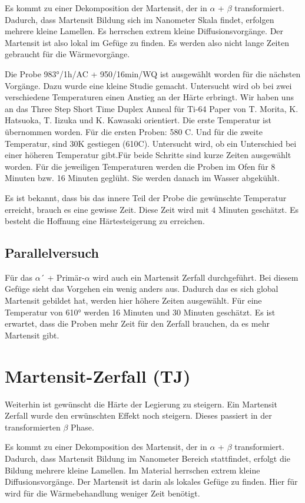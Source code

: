Es kommt zu einer Dekomposition der Martensit, der in $\alpha$ + $\beta$ transformiert. Dadurch, dass Martensit Bildung sich im Nanometer Skala findet, erfolgen mehrere kleine Lamellen. Es herrschen extrem kleine Diffusionsvorgänge. Der Martensit ist also lokal im Gefüge zu finden. Es werden also nicht lange Zeiten gebraucht für die Wärmevorgänge.

Die Probe 983°/1h/AC + 950/16min/WQ ist ausgewählt worden für die nächsten Vorgänge. Dazu wurde eine kleine Studie gemacht. Untersucht wird ob bei zwei verschiedene Temperaturen einen Anstieg an der Härte erbringt. Wir haben uns an das Three Step Short Time Duplex Anneal für Ti-64 Paper von T. Morita, K. Hatsuoka, T. Iizuka und K. Kawasaki orientiert. Die erste Temperatur ist übernommen worden. Für die ersten Proben: 580 C. Und für die zweite Temperatur, sind 30K gestiegen (610C). Untersucht wird, ob ein Unterschied bei einer höheren Temperatur gibt.Für beide Schritte sind kurze Zeiten ausgewählt worden. Für die jeweiligen Temperaturen werden die Proben im Ofen für 8 Minuten bzw. 16 Minuten geglüht. Sie werden danach im Wasser abgekühlt. 

Es ist bekannt, dass bis das innere Teil der Probe die gewünschte Temperatur erreicht, brauch es eine gewisse Zeit. Diese Zeit wird mit 4 Minuten geschätzt. Es besteht die Hoffnung eine Härtesteigerung zu erreichen.



\subsection{Parallelversuch}

Für das $\alpha$´ + Primär-$\alpha$ wird auch ein Martensit Zerfall durchgeführt. Bei diesem Gefüge sieht das Vorgehen ein wenig anders aus. Dadurch das es sich global Martensit gebildet hat, werden hier höhere Zeiten ausgewählt. Für eine Temperatur von 610° werden 16 Minuten und 30 Minuten geschätzt. Es ist erwartet, dass die Proben mehr Zeit für den Zerfall brauchen, da es mehr Martensit gibt. 


\section{Martensit-Zerfall (TJ)}
Weiterhin ist gewünscht die Härte der Legierung zu steigern. Ein Martensit Zerfall wurde den erwünschten Effekt noch steigern. Dieses passiert in der transformierten $\beta$ Phase.

Es kommt zu einer Dekomposition des Martensit, der in $\alpha$ + $\beta$ transformiert. Dadurch, dass Martensit Bildung im Nanometer Bereich stattfindet, erfolgt die Bildung mehrere kleine Lamellen. Im Material herrschen extrem kleine Diffusionsvorgänge. Der Martensit ist darin als lokales Gefüge zu finden. Hier für wird für die Wärmebehandlung weniger Zeit benötigt.

